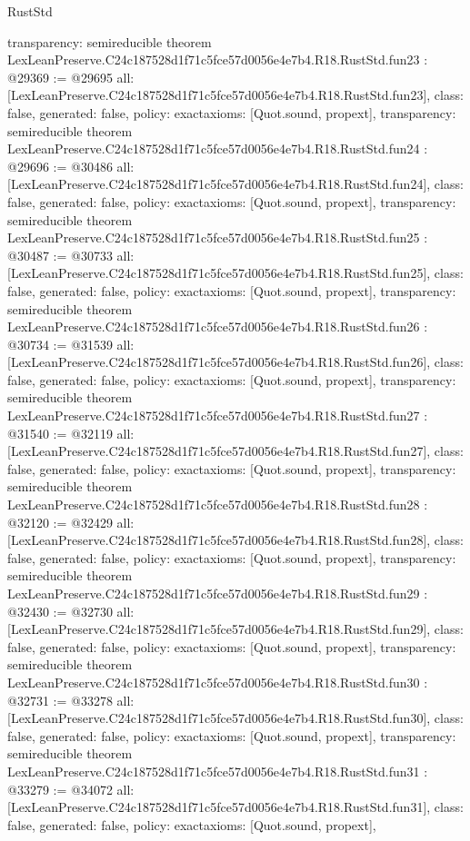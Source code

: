 \begin{lexlean}{RustStd}
\begin{coremodule}
{  transparency: semireducible
}
theorem LexLeanPreserve.C24c187528d1f71c5fce57d0056e4e7b4.R18.RustStd.fun23 : @29369 := @29695 {
  all: [LexLeanPreserve.C24c187528d1f71c5fce57d0056e4e7b4.R18.RustStd.fun23],
  class: false,
  generated: false,
  policy: exact{axioms: [Quot.sound, propext]},
  transparency: semireducible
}
theorem LexLeanPreserve.C24c187528d1f71c5fce57d0056e4e7b4.R18.RustStd.fun24 : @29696 := @30486 {
  all: [LexLeanPreserve.C24c187528d1f71c5fce57d0056e4e7b4.R18.RustStd.fun24],
  class: false,
  generated: false,
  policy: exact{axioms: [Quot.sound, propext]},
  transparency: semireducible
}
theorem LexLeanPreserve.C24c187528d1f71c5fce57d0056e4e7b4.R18.RustStd.fun25 : @30487 := @30733 {
  all: [LexLeanPreserve.C24c187528d1f71c5fce57d0056e4e7b4.R18.RustStd.fun25],
  class: false,
  generated: false,
  policy: exact{axioms: [Quot.sound, propext]},
  transparency: semireducible
}
theorem LexLeanPreserve.C24c187528d1f71c5fce57d0056e4e7b4.R18.RustStd.fun26 : @30734 := @31539 {
  all: [LexLeanPreserve.C24c187528d1f71c5fce57d0056e4e7b4.R18.RustStd.fun26],
  class: false,
  generated: false,
  policy: exact{axioms: [Quot.sound, propext]},
  transparency: semireducible
}
theorem LexLeanPreserve.C24c187528d1f71c5fce57d0056e4e7b4.R18.RustStd.fun27 : @31540 := @32119 {
  all: [LexLeanPreserve.C24c187528d1f71c5fce57d0056e4e7b4.R18.RustStd.fun27],
  class: false,
  generated: false,
  policy: exact{axioms: [Quot.sound, propext]},
  transparency: semireducible
}
theorem LexLeanPreserve.C24c187528d1f71c5fce57d0056e4e7b4.R18.RustStd.fun28 : @32120 := @32429 {
  all: [LexLeanPreserve.C24c187528d1f71c5fce57d0056e4e7b4.R18.RustStd.fun28],
  class: false,
  generated: false,
  policy: exact{axioms: [Quot.sound, propext]},
  transparency: semireducible
}
theorem LexLeanPreserve.C24c187528d1f71c5fce57d0056e4e7b4.R18.RustStd.fun29 : @32430 := @32730 {
  all: [LexLeanPreserve.C24c187528d1f71c5fce57d0056e4e7b4.R18.RustStd.fun29],
  class: false,
  generated: false,
  policy: exact{axioms: [Quot.sound, propext]},
  transparency: semireducible
}
theorem LexLeanPreserve.C24c187528d1f71c5fce57d0056e4e7b4.R18.RustStd.fun30 : @32731 := @33278 {
  all: [LexLeanPreserve.C24c187528d1f71c5fce57d0056e4e7b4.R18.RustStd.fun30],
  class: false,
  generated: false,
  policy: exact{axioms: [Quot.sound, propext]},
  transparency: semireducible
}
theorem LexLeanPreserve.C24c187528d1f71c5fce57d0056e4e7b4.R18.RustStd.fun31 : @33279 := @34072 {
  all: [LexLeanPreserve.C24c187528d1f71c5fce57d0056e4e7b4.R18.RustStd.fun31],
  class: false,
  generated: false,
  policy: exact{axioms: [Quot.sound, propext]},
}
\end{coremodule}
\end{lexlean}
